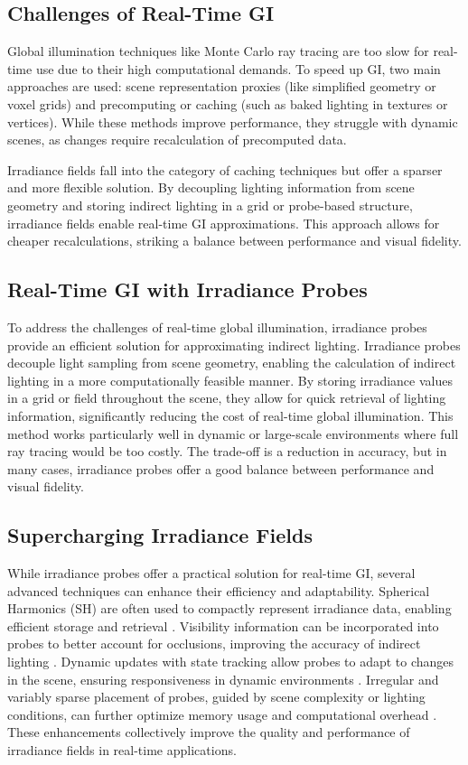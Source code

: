 \documentclass[acmtog, nonacm]{acmart}
\begin{document}
\subsection{Challenges of Real-Time GI}
Global illumination techniques like Monte Carlo ray tracing are too slow for real-time use due to their high computational demands. To speed up GI, two main approaches are used: scene representation proxies (like simplified geometry or voxel grids) and precomputing or caching (such as baked lighting in textures or vertices). While these methods improve performance, they struggle with dynamic scenes, as changes require recalculation of precomputed data.

Irradiance fields fall into the category of caching techniques but offer a sparser and more flexible solution. By decoupling lighting information from scene geometry and storing indirect lighting in a grid or probe-based structure, irradiance fields enable real-time GI approximations. This approach allows for cheaper recalculations, striking a balance between performance and visual fidelity.

\subsection{Real-Time GI with Irradiance Probes}
To address the challenges of real-time global illumination, irradiance probes provide an efficient solution for approximating indirect lighting. Irradiance probes decouple light sampling from scene geometry, enabling the calculation of indirect lighting in a more computationally feasible manner. By storing irradiance values in a grid or field throughout the scene, they allow for quick retrieval of lighting information, significantly reducing the cost of real-time global illumination. This method works particularly well in dynamic or large-scale environments where full ray tracing would be too costly. The trade-off is a reduction in accuracy, but in many cases, irradiance probes offer a good balance between performance and visual fidelity.

\subsection{Supercharging Irradiance Fields}
While irradiance probes offer a practical solution for real-time GI, several advanced techniques can enhance their efficiency and adaptability. Spherical Harmonics (SH) are often used to compactly represent irradiance data, enabling efficient storage and retrieval \cite{sloan2008stupid, schneider2017efficient}. Visibility information can be incorporated into probes to better account for occlusions, improving the accuracy of indirect lighting \cite{silvennoinen2017real}. Dynamic updates with state tracking allow probes to adapt to changes in the scene, ensuring responsiveness in dynamic environments \cite{sedlacek2019real, datta2023adaptive}. Irregular and variably sparse placement of probes, guided by scene complexity or lighting conditions, can further optimize memory usage and computational overhead \cite{vardis2015efficient}. These enhancements collectively improve the quality and performance of irradiance fields in real-time applications.
\end{document}
